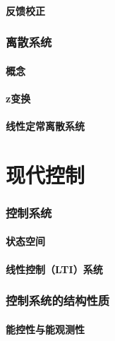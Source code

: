 \documentclass[
12pt, %
a4paper, 
oneside, %
headinclude,footinclude, %
]{scrartcl}
\begin{document}
\subsection[反馈校正]{反馈校正}
\section{离散系统}
\subsection[概念]{概念}
\subsection[z变换]{z变换}
\subsection[线性定常离散系统]{线性定常离散系统}
\part{现代控制}
\section{控制系统}
\subsection[状态空间]{状态空间}
\subsection[线性控制系统]{线性控制（LTI）系统}
\section{控制系统的结构性质}
\subsection[能控性与能观测性]{能控性与能观测性}
\end{document}

